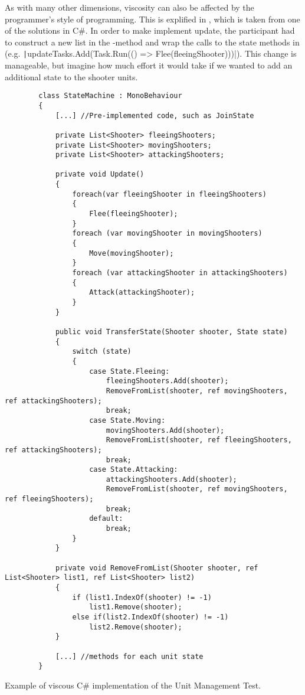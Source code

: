 As with many other dimensions, viscosity can also be affected by the programmer's style of programming. This is explified in , which is taken from one of the solutions in C\#. In order to make implement  update, the participant had to construct a new list in the -method and wrap the calls to the state methods in  (e.g. \texttt|updateTasks.Add(Task.Run(() => Flee(fleeingShooter)))|). This change is manageable, but imagine how much effort it would take if we wanted to add an additional state to the shooter units. 

\begin{listing}
    \begin{verbatim}
        class StateMachine : MonoBehaviour
        {
            [...] //Pre-implemented code, such as JoinState

            private List<Shooter> fleeingShooters;
            private List<Shooter> movingShooters;
            private List<Shooter> attackingShooters;
        
            private void Update()
            {
                foreach(var fleeingShooter in fleeingShooters)
                {
                    Flee(fleeingShooter);
                }
                foreach (var movingShooter in movingShooters)
                {
                    Move(movingShooter);
                }
                foreach (var attackingShooter in attackingShooters)
                {
                    Attack(attackingShooter);
                }
            }
        
            public void TransferState(Shooter shooter, State state)
            {
                switch (state)
                {
                    case State.Fleeing:
                        fleeingShooters.Add(shooter);
                        RemoveFromList(shooter, ref movingShooters, ref attackingShooters);
                        break;
                    case State.Moving:
                        movingShooters.Add(shooter);
                        RemoveFromList(shooter, ref fleeingShooters, ref attackingShooters);
                        break;
                    case State.Attacking:
                        attackingShooters.Add(shooter);
                        RemoveFromList(shooter, ref movingShooters, ref fleeingShooters);
                        break;
                    default:
                        break;
                }
            }
        
            private void RemoveFromList(Shooter shooter, ref List<Shooter> list1, ref List<Shooter> list2)
            {
                if (list1.IndexOf(shooter) != -1)
                    list1.Remove(shooter);
                else if(list2.IndexOf(shooter) != -1)
                    list2.Remove(shooter);
            }
        
            [...] //methods for each unit state
        }
    \end{verbatim}
    \caption{Example of viscous C\# implementation of the Unit Management Test.}
    \label{lst:csharp:viscous}
\end{listing}